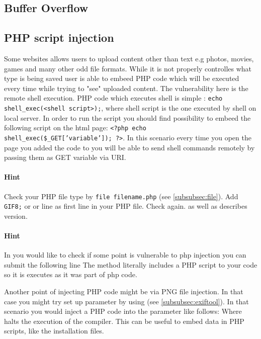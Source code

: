 \subsection{Buffer Overflow}


\subsection{PHP script injection}
\label{subsec:phpinjection}
Some websites allows users to upload content other than text e.g photos, movies, games and many other odd file formats.
While it is not properly controlles what type is being saved user is able to embeed PHP code which will be executed every time while trying to "see" uploaded content.
The vulnerability here is the remote shell execution.
PHP code which executes shell is simple : \texttt{echo shell\_exec(<shell script>);}, where shell script is the one executed by shell on local server.
In order to run the script you should find possibility to embeed the following script on the html page: \texttt{<?php echo shell\_exec(\$\_GET['variable']); ?>}.
In this scenario every time you open the page you added  the code to
you will be able to send shell commands remotely by passing them as GET variable via URI.

\paragraph{Hint} Check your PHP file type by \texttt{file filename.php} (see \ref{subsubsec:file}).
Add \texttt{GIF8;} or  or  line as first line in your PHP file.
Check again.
 as well as  describes version.

\paragraph{Hint} In you would like to check if some point is vulnerable to php injection you can submit the following line 
The  method literally includes a PHP script to your code so it is executes as it was part of php code.

Another point of injecting PHP code might be via PNG file injection.
In that case you might try set up  parameter by using  (see \ref{subsubsec:exiftool}).
In that scenario you would inject a PHP code into the parameter like follows:  \newline
{} \newline
Where  halts the execution of the compiler.
This can be useful to embed data in PHP scripts, like the installation files.


